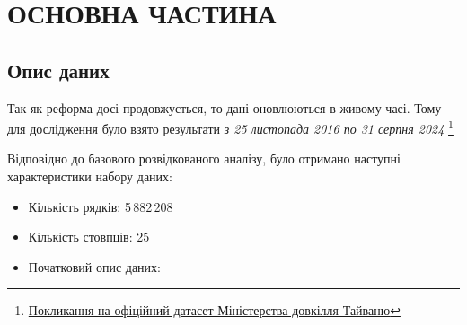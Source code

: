 \documentclass[./report.tex]{subfiles}
\begin{document}
\section{ОСНОВНА ЧАСТИНА}
\subsection{Опис даних}
Так як реформа досі продовжується, то дані оновлюються в живому часі.
Тому для дослідження було взято результати \textit{з 25 листопада 2016 по 31 серпня 2024}
\footnote{
  \href{https://data.moenv.gov.tw/en/dataset/detail/aqx_p_488}
  {Покликання на офіційний датасет Міністерства довкілля Тайваню}
}

Відповідно до базового розвідкованого аналізу, було отримано наступні характеристики набору даних:

\begin{itemize}
  \item Кількість рядків: 5\,882\,208
  \item Кількість стовпців: 25
  \item Початковий опис даних:


\end{itemize}
\end{document}
